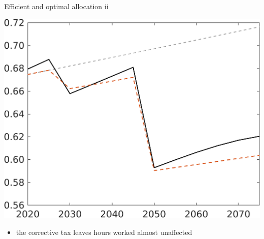 \documentclass[11pt,aspectratio=169]{beamer}
\begin{document}
\begin{frame}{Efficient and optimal allocation ii }
\begin{minipage}[]{0.3\textwidth}
	\end{minipage}
		\begin{minipage}[]{0.3\textwidth}
		\includegraphics[width=1\textwidth]{../codding_model/own_basedOnFried/optimalPol_elastS_DisuSci/figures/all_1705/C_CompEffOPT_T_NoTaus_noopt_spillover0_noskill0_sep1_BN0_ineq0_red0_xgrowth0_zero0_countec0_etaa0.79_lgd0_lff1.png}
	\end{minipage}
	
	\vspace{3mm}
	\begin{itemize}
		\item the corrective tax leaves hours worked almost unaffected
	\end{itemize}
\end{frame}
\end{document}
